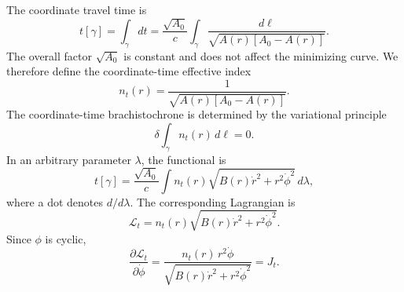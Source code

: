 \documentclass[
  aps,
  prd,
  twocolumn,
  nofootinbib,
  superscriptaddress,
  longbibliography
]{revtex4-2}
\begin{document}
The coordinate travel time is
\begin{equation}
t[\gamma]
=
\int_\gamma dt
=
\frac{\sqrt{A_0}}{c}
\int_\gamma
\frac{d\ell}{\sqrt{A(r)\left[A_0-A(r)\right]}}.
\end{equation}
The overall factor $\sqrt{A_0}$ is constant and does not affect the
minimizing curve. We therefore define the coordinate-time effective
index
\begin{equation}
n_t(r)
=
\frac{1}{\sqrt{A(r)\left[A_0-A(r)\right]}}.
\label{eq:nt_def}
\end{equation}
The coordinate-time brachistochrone is determined by the variational
principle
\begin{equation}
\delta
\int_\gamma
n_t(r)\,d\ell
=
0.
\label{eq:t_variational}
\end{equation}
In an arbitrary parameter $\lambda$, the functional is
\begin{equation}
t[\gamma]
=
\frac{\sqrt{A_0}}{c}
\int
n_t(r)
\sqrt{
B(r)\dot{r}^2+r^2\dot{\phi}^2
}
\,d\lambda,
\end{equation}
where a dot denotes $d/d\lambda$. The corresponding Lagrangian is
\begin{equation}
\mathcal{L}_t
=
n_t(r)
\sqrt{
B(r)\dot{r}^2+r^2\dot{\phi}^2
}.
\end{equation}
Since $\phi$ is cyclic,
\begin{equation}
\frac{\partial\mathcal{L}_t}{\partial\dot{\phi}}
=
\frac{
n_t(r)\,r^2\dot{\phi}
}{
\sqrt{B(r)\dot{r}^2+r^2\dot{\phi}^2}
}
=
J_t.
\label{eq:Jt_def}
\end{equation}
\end{document}
